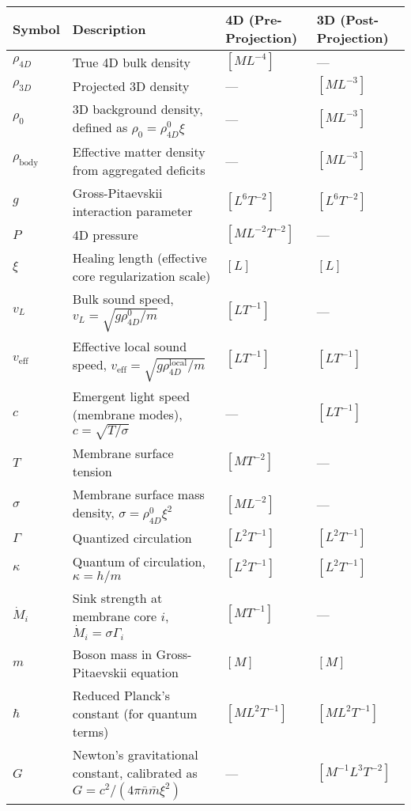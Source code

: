 \begin{table}[H]
\centering
\begin{tabularx}{\textwidth}{|l|Y|l|l|}
\hline
Symbol & Description & 4D (Pre-Projection) & 3D (Post-Projection) \\
\hline
$\rho_{4D}$ & True 4D bulk density & $[M L^{-4}]$ & --- \\
\hline
$\rho_{3D}$ & Projected 3D density & --- & $[M L^{-3}]$ \\
\hline
$\rho_0$ & 3D background density, defined as $\rho_0 = \rho_{4D}^0 \xi$ & --- & $[M L^{-3}]$ \\
\hline
$\rho_{\text{body}}$ & Effective matter density from aggregated deficits & --- & $[M L^{-3}]$ \\
\hline
$g$ & Gross-Pitaevskii interaction parameter & $[L^6 T^{-2}]$ & $[L^6 T^{-2}]$ \\
\hline
$P$ & 4D pressure & $[M L^{-2} T^{-2}]$ & --- \\
\hline
$\xi$ & Healing length (effective core regularization scale) & $[L]$ & $[L]$ \\
\hline
$v_L$ & Bulk sound speed, $v_L = \sqrt{g \rho_{4D}^0 / m}$ & $[L T^{-1}]$ & --- \\
\hline
$v_{\text{eff}}$ & Effective local sound speed, $v_{\text{eff}} = \sqrt{g \rho_{4D}^{\text{local}} / m}$ & $[L T^{-1}]$ & $[L T^{-1}]$ \\
\hline
$c$ & Emergent light speed (membrane modes), $c = \sqrt{T / \sigma}$ & --- & $[L T^{-1}]$ \\
\hline
$T$ & Membrane surface tension & $[M T^{-2}]$ & --- \\
\hline
$\sigma$ & Membrane surface mass density, $\sigma = \rho_{4D}^0 \xi^2$ & $[M L^{-2}]$ & --- \\
\hline
$\Gamma$ & Quantized circulation & $[L^2 T^{-1}]$ & $[L^2 T^{-1}]$ \\
\hline
$\kappa$ & Quantum of circulation, $\kappa = h / m$ & $[L^2 T^{-1}]$ & $[L^2 T^{-1}]$ \\
\hline
$\dot{M}_i$ & Sink strength at membrane core $i$, $\dot{M}_i = \sigma \Gamma_i$ & $[M T^{-1}]$ & --- \\
\hline
$m$ & Boson mass in Gross-Pitaevskii equation & $[M]$ & $[M]$ \\
\hline
$\hbar$ & Reduced Planck's constant (for quantum terms) & $[M L^2 T^{-1}]$ & $[M L^2 T^{-1}]$ \\
\hline
$G$ & Newton's gravitational constant, calibrated as $G = c^2 / (4\pi \bar{n} \bar{m} \xi^2)$ & --- & $[M^{-1} L^3 T^{-2}]$ \\

\end{tabularx}
\end{table}

